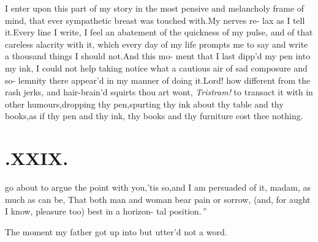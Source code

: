 \documentclass{article}
\begin{document}
I enter upon this part of my story in the most pensive and
melancholy frame of mind, that ever sympathetic breast\break
was touched with.\tsh My nerves re-\break
lax as I tell it.\tsh Every line I write,\break
I feel an abatement of the quickness of
my pulse, and of that careless alacrity\break
with it, which every day of my life\break
prompts me to say and write a thousand\break
things I should not.\tsh And this mo-\break
ment that I last dipp’d my pen into my\break
ink, I could not help taking notice what\break
a cautious air of sad composure and so-\break
lemnity there appear’d in my manner of\break
doing it.\tsh Lord! how different from\break
the rash jerks, and hair-brain’d squirts\break
thou art wont, \textit{Tristram!} to transact it\break
with in other humours,\tsk dropping thy\break
pen,\tsk spurting thy ink about thy table\break
and thy books,\tsh as if thy pen and thy\break
ink, thy books and thy furniture cost\break
thee nothing.

\section{.\quad  XXIX.}

 go about to argue the\break
point with you,\tsk ’tis so,\tsk and
I am persuaded of it, madam, as much\break
as can be, \lqq That both man and woman\break
\lqq bear pain or sorrow, (and, for aught I\break
\lqq know, pleasure too) best in a horizon-\break
\lqq tal position.\,”

The moment my father got up into 
but utter’d not a word.
\end{document}
